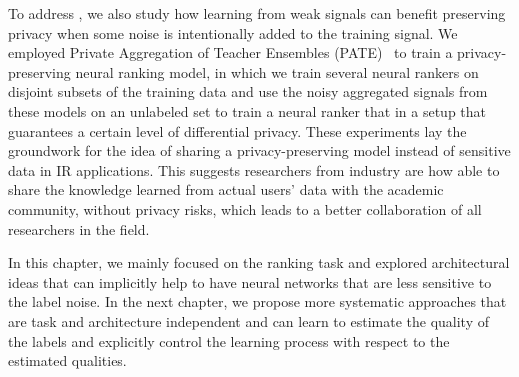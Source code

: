 To address \textbf{}, we also study how learning from weak signals can benefit preserving privacy when some noise is intentionally added to the training signal. We employed Private Aggregation of Teacher Ensembles (PATE)~\citep{Papernot:2017}  to train a privacy-preserving neural ranking model, in which we train several neural rankers on disjoint subsets of the training data and use the noisy aggregated signals from these models on an unlabeled set to train a neural ranker that in a setup that guarantees a certain level of differential privacy.
These experiments lay the groundwork for the idea of sharing a privacy-preserving model instead of sensitive data in IR applications. This suggests researchers from industry are how able to share the knowledge learned from actual users' data with the academic community, without privacy risks, which leads to a better collaboration of all researchers in the field. 

\bigskip
In this chapter, we mainly focused on the ranking task and explored architectural ideas that can implicitly help to have neural networks that are less sensitive to the label noise.  
In the next chapter, we propose more systematic approaches that are task and architecture independent and can learn to estimate the quality of the labels and explicitly control the learning process with respect to the estimated qualities.